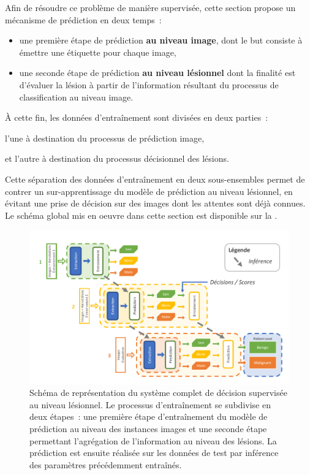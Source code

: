 Afin de résoudre ce problème de manière supervisée, cette section propose un mécanisme de prédiction en deux temps~: 
\begin{itemize}
    \item une première étape de prédiction \textbf{au niveau image}, dont le but consiste à émettre une étiquette pour chaque image,
    \item une seconde étape de prédiction \textbf{au niveau lésionnel} dont la finalité est d'évaluer la lésion à partir de l'information résultant du processus de classification au niveau image.
\end{itemize} À cette fin, les données d'entraînement sont divisées en deux parties~:
\begin{inlinerate}
    \item l'une à destination du processus de prédiction image,
    \item et l'autre à destination du processus décisionnel des lésions.
\end{inlinerate}
Cette séparation des données d'entraînement en deux sous-ensembles permet de contrer un sur-apprentissage du modèle de prédiction au niveau lésionnel, en évitant une prise de décision sur des images dont les attentes sont déjà connues. Le schéma global mis en oeuvre dans cette section est disponible sur la .\par

\begin{figure}[H]
    \centering
    \includegraphics[width=0.95\linewidth]{contents/chapter_7/resources/scheme_patient_decision.pdf}
    \caption{Schéma de représentation du système complet de décision supervisée au niveau lésionnel. Le processus d'entraînement se subdivise en deux étapes~: une première étape d'entraînement du modèle de prédiction au niveau des instances images et une seconde étape permettant l'agrégation de l'information au niveau des lésions. La prédiction est ensuite réalisée sur les données de test par inférence des paramètres précédemment entraînés.}
    \label{fig:scheme_patient_decision}
\end{figure}\par

